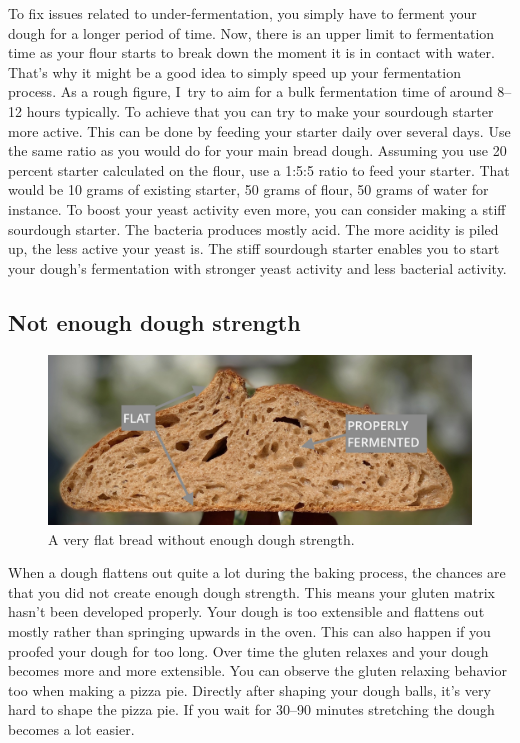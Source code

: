 To fix issues related to under-fermentation, you simply have to ferment your dough
for a longer period of time. Now, there is an upper limit to fermentation time
as your flour starts to break down the moment it is in contact with water. That's why it
might be a good idea to simply speed up your fermentation process. As a rough
figure, I~try to aim for a bulk fermentation time of around 8--12 hours typically.
To achieve that you can try to make your sourdough starter more active.  This can be done
by feeding your starter daily over several days. Use the same ratio as you would
do for your main bread dough. Assuming you use 20 percent starter calculated on the flour,
use a 1:5:5 ratio to feed your starter. That would be 10 grams of existing starter,
50 grams of flour, 50 grams of water for instance.
To boost your yeast activity even more, you can consider making a stiff sourdough 
starter. The bacteria produces mostly acid. The more acidity
is piled up, the less active your yeast is. The stiff sourdough starter
enables you to start your dough's fermentation with stronger yeast activity
and less bacterial activity.

\subsection{Not enough dough strength}

\begin{figure}
  \includegraphics[width=\textwidth]{flat-bread}
  \caption{A very flat bread without enough dough strength.}%
  \label{flat-bread}
\end{figure}

When a dough flattens out quite a lot during the baking process, the chances are
that you did not create enough dough strength. This means your gluten matrix
hasn't been developed properly. Your dough is too extensible and flattens out
mostly rather than springing upwards in the oven. This can also happen if you
proofed your dough for too long. Over time the gluten relaxes and your dough
becomes more and more extensible. You can observe the gluten relaxing behavior
too when making a pizza pie. Directly after shaping your dough balls, it's very hard to shape
the pizza pie. If you wait for 30--90 minutes stretching the dough becomes a lot easier.

